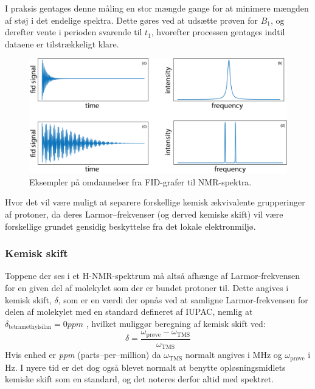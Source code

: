     I praksis gentages denne måling en stor mængde gange for at minimere mængden af støj i det endelige spektra. Dette gøres ved at udsætte prøven for $B_1$, og derefter vente i perioden svarende til $t_1$, hvorefter processen gentages indtil dataene er tilstrækkeligt klare.
    \begin{figure}[H]
        \includegraphics[width=\textwidth]{billeder/fourier}
        \caption{Eksempler på omdannelser fra FID-grafer til NMR-spektra.}
    \end{figure}
    Hvor det vil være muligt at separere forskellige kemisk ækvivalente grupperinger af protoner, da deres Larmor--frekvenser (og derved kemiske skift) vil være forskellige grundet gensidig beskyttelse fra det lokale elektronmiljø.

    \subsubsection{Kemisk skift}
    Toppene der ses i et H-NMR-spektrum må altså afhænge af Larmor-frekvensen for en given del af molekylet som der er bundet protoner til. Dette angives i kemisk skift, $\delta$, som er en værdi der opnås ved at samligne Larmor-frekvensen for delen af molekylet med en standard defineret af IUPAC, nemlig at $\delta_{\text{tetramethylsilan}}=0\si{ppm}$ \parencite{Robi2009}, hvilket muliggør beregning af kemisk skift ved:
    \[
        \delta = \frac{\omega_{\text{prøve}}-\omega_{\text{TMS}}}{\omega_{\text{TMS}}}
    \]
    Hvis enhed er \textit{ppm} (parts--per--million) da $\omega_{\text{TMS}}$ normalt angives i MHz og  $\omega_{\text{prøve}}$ i Hz. I nyere tid er det dog også blevet normalt at benytte opløsningsmidlets kemiske skift som en standard, og det noteres derfor altid med spektret.


